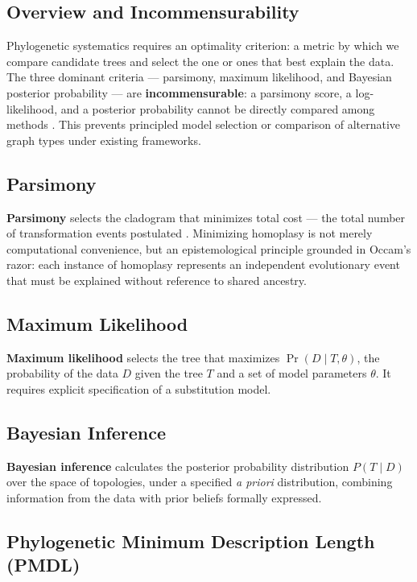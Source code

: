\subsection{Overview and Incommensurability}

Phylogenetic systematics requires an optimality criterion: a metric by which we compare candidate trees and select the one or ones that best explain the data. The three dominant criteria --- parsimony, maximum likelihood, and Bayesian posterior probability --- are \textbf{incommensurable}: a parsimony score, a log-likelihood, and a posterior probability cannot be directly compared among methods \parencite{wheelervaron2025}. This prevents principled model selection or comparison of alternative graph types under existing frameworks.

\subsection{Parsimony}

\textbf{Parsimony} selects the cladogram that minimizes total cost --- the total number of transformation events postulated \parencite{farris1983,wheeleretal2006}. Minimizing homoplasy is not merely computational convenience, but an epistemological principle grounded in Occam's razor: each instance of homoplasy represents an independent evolutionary event that must be explained without reference to shared ancestry.

\subsection{Maximum Likelihood}

\textbf{Maximum likelihood} selects the tree that maximizes $\Pr(D \mid T, \theta)$, the probability of the data $D$ given the tree $T$ and a set of model parameters $\theta$. It requires explicit specification of a substitution model.

\subsection{Bayesian Inference}

\textbf{Bayesian inference} calculates the posterior probability distribution $P(T \mid D)$ over the space of topologies, under a specified \textit{a priori} distribution, combining information from the data with prior beliefs formally expressed.

\subsection{Phylogenetic Minimum Description Length (PMDL)}

